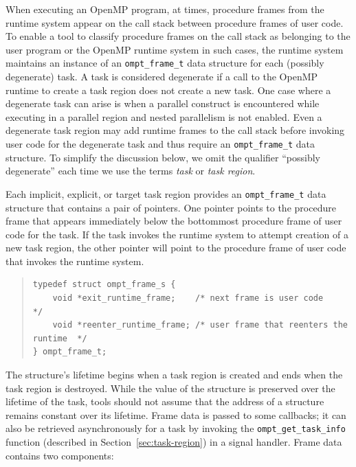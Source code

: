 \documentclass{article}
\begin{document}
  When executing an OpenMP program, at times, procedure frames from the runtime system appear on the call stack between procedure frames of user code.
  To enable a tool to classify procedure frames on the call stack as belonging to the user program or the OpenMP runtime system in such cases, 
  the runtime system maintains an instance of an \verb|ompt_frame_t| data structure 
  for each (possibly degenerate) task. A task is considered degenerate if a call to the OpenMP runtime to create a task 
  region does not create a new task. One case where a degenerate task can arise is when a parallel construct is encountered
  while executing in a parallel region and nested parallelism is not enabled. 
  Even a degenerate task region may add runtime frames to the call stack before 
  invoking user code for the degenerate task and thus require an \verb|ompt_frame_t| data structure. 
  To simplify the discussion below, we omit the qualifier ``possibly degenerate'' each time we use the terms {\em task} or {\em task region}.

  Each implicit, explicit, or target task region provides an \verb|ompt_frame_t| data structure
  that contains a pair of pointers. One pointer points to the procedure frame that appears immediately below 
  the bottommost procedure frame of user code for the task. If the task invokes the runtime
  system to attempt creation of a new task region, the other pointer will point to the procedure frame 
  of user code that invokes the runtime system.  
    
\begin{quote}
\begin{verbatim}
typedef struct ompt_frame_s {
    void *exit_runtime_frame;    /* next frame is user code     */
    void *reenter_runtime_frame; /* user frame that reenters the runtime  */
} ompt_frame_t;
\end{verbatim}
\end{quote}

\noindent
  The structure's lifetime begins when a task region is
  created and ends when the task region is destroyed.  While the
  value of the structure is preserved over the lifetime of the task,
  tools should not assume that the address of a structure remains
  constant over its lifetime.
  Frame data is passed to some callbacks; it can also be retrieved
  asynchronously
  for a task by invoking the \verb|ompt_get_task_info|  function (described in Section~\ref{sec:task-region}) in a signal handler.
  Frame data contains two components:
\end{document}
